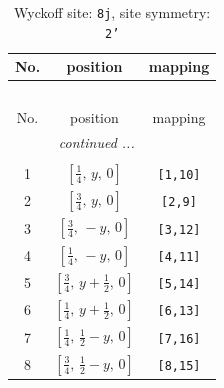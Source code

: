 \documentclass[fleqn,8pt]{jsarticle}
\begin{document}
\begin{longtable}{ccc}
\caption{Wyckoff site: {\tt 8j}, site symmetry: {\tt 2'}}
 \\
 \hline \hline
No. & position & mapping \\ \hline \endfirsthead

\multicolumn{2}{l}{\tablename\ \thetable{}} \\
 \hline \hline
No. & position & mapping \\ \hline \endhead

 \hline \hline
\multicolumn{2}{r}{\footnotesize\it continued ...} \\ \endfoot

 \hline \hline
\multicolumn{2}{r}{} \\ \endlastfoot

1 & $\left[ \frac{1}{4},\, y,\, 0 \right]$ & {\tt [1,10]} \\ \hline
2 & $\left[ \frac{3}{4},\, y,\, 0 \right]$ & {\tt [2,9]} \\ \hline
3 & $\left[ \frac{3}{4},\, - y,\, 0 \right]$ & {\tt [3,12]} \\ \hline
4 & $\left[ \frac{1}{4},\, - y,\, 0 \right]$ & {\tt [4,11]} \\ \hline
5 & $\left[ \frac{3}{4},\, y + \frac{1}{2},\, 0 \right]$ & {\tt [5,14]} \\ \hline
6 & $\left[ \frac{1}{4},\, y + \frac{1}{2},\, 0 \right]$ & {\tt [6,13]} \\ \hline
7 & $\left[ \frac{1}{4},\, \frac{1}{2} - y,\, 0 \right]$ & {\tt [7,16]} \\ \hline
8 & $\left[ \frac{3}{4},\, \frac{1}{2} - y,\, 0 \right]$ & {\tt [8,15]} \\
\end{longtable}
\renewcommand{\arraystretch}{1.2}
\end{document}
